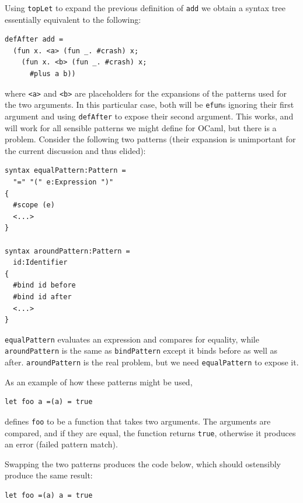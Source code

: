\documentclass{kththesis}
\begin{document}
Using \texttt{topLet} to expand the previous definition of \texttt{add} we obtain a syntax tree essentially equivalent to the following:

\begin{verbatim}
defAfter add =
  (fun x. <a> (fun _. #crash) x;
    (fun x. <b> (fun _. #crash) x;
      #plus a b))
\end{verbatim}

where \texttt{<a>} and \texttt{<b>} are placeholders for the expansions of the patterns used for the two arguments. In this particular case, both will be \texttt{efun}s ignoring their first argument and using \texttt{defAfter} to expose their second argument. This works, and will work for all sensible patterns we might define for OCaml, but there is a problem. Consider the following two patterns (their expansion is unimportant for the current discussion and thus elided):

\begin{verbatim}
syntax equalPattern:Pattern =
  "=" "(" e:Expression ")"
{
  #scope (e)
  <...>
}

syntax aroundPattern:Pattern =
  id:Identifier
{
  #bind id before
  #bind id after
  <...>
}
\end{verbatim}

\texttt{equalPattern} evaluates an expression and compares for equality, while \texttt{aroundPattern} is the same as \texttt{bindPattern} except it binds before as well as after. \texttt{aroundPattern} is the real problem, but we need \texttt{equalPattern} to expose it.

As an example of how these patterns might be used,

\begin{verbatim}
let foo a =(a) = true
\end{verbatim}

defines \texttt{foo} to be a function that takes two arguments. The arguments are compared, and if they are equal, the function returns \texttt{true}, otherwise it produces an error (failed pattern match).

Swapping the two patterns produces the code below, which should ostensibly produce the same result:

\begin{verbatim}
let foo =(a) a = true
\end{verbatim}
\end{document}

